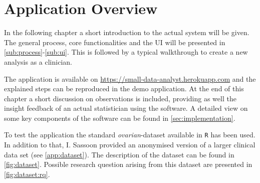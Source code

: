 \section{Application Overview}
\label{sec:app}
In the following chapter a short introduction to the actual system will be given. The general process, core functionalities and the \gls{UI} will be presented in \autoref{sub:process}-\ref{sub:ui}. This is followed by a typical walkthrough to create a new analysis as a clinician. 

The application is available on \href{https://small-data-analyst.herokuapp.com}{https://small-data-analyst.herokuapp.com} and the explained steps can be reproduced in the demo application. At the end of this chapter a short discussion on observations is included, providing as well the insight feedback of an actual statistician using the software. A detailed view on some key components of the software can be found in \autoref{sec:implementation}.

To test the application the standard \textit{ovarian}-dataset available in \texttt{R} has been used. In addition to that, I. Sassoon provided an anonymised version of a larger clinical data set (see \autoref{app:dataset}). The description of the dataset can be found in \autoref{fig:dataset}. Possible research question arising from this dataset are presented in \autoref{fig:dataset:rq}.









